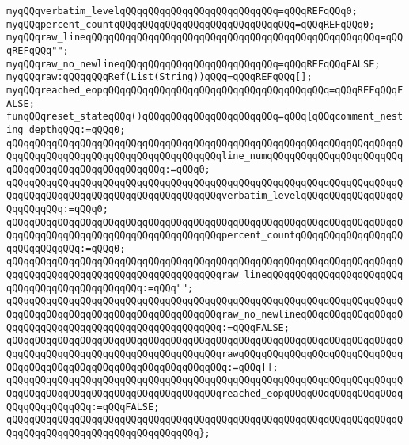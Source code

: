 \verb|myqQQqverbatim_levelqQQqqQQqqQQqqQQqqQQqqQQqqQQq=qQQqREFqQQq0;|\newline
\verb|myqQQqpercent_countqQQqqQQqqQQqqQQqqQQqqQQqqQQqqQQq=qQQqREFqQQq0;|\newline
\verb|myqQQqraw_lineqQQqqQQqqQQqqQQqqQQqqQQqqQQqqQQqqQQqqQQqqQQqqQQqqQQq=qQQqREFqQQq"";|\newline
\verb|myqQQqraw_no_newlineqQQqqQQqqQQqqQQqqQQqqQQqqQQq=qQQqREFqQQqFALSE;|\newline
\verb|myqQQqraw:qQQqqQQqRef(List(String))qQQq=qQQqREFqQQq[];|\newline
\verb|myqQQqreached_eopqQQqqQQqqQQqqQQqqQQqqQQqqQQqqQQqqQQqqQQq=qQQqREFqQQqFALSE;|\newline
\newline
\verb|funqQQqreset_stateqQQq()qQQqqQQqqQQqqQQqqQQqqQQq=qQQq{qQQqcomment_nesting_depthqQQq:=qQQq0;|\newline
\verb|qQQqqQQqqQQqqQQqqQQqqQQqqQQqqQQqqQQqqQQqqQQqqQQqqQQqqQQqqQQqqQQqqQQqqQQqqQQqqQQqqQQqqQQqqQQqqQQqqQQqqQQqqQQqline_numqQQqqQQqqQQqqQQqqQQqqQQqqQQqqQQqqQQqqQQqqQQqqQQqqQQq:=qQQq0;|\newline
\verb|qQQqqQQqqQQqqQQqqQQqqQQqqQQqqQQqqQQqqQQqqQQqqQQqqQQqqQQqqQQqqQQqqQQqqQQqqQQqqQQqqQQqqQQqqQQqqQQqqQQqqQQqqQQqverbatim_levelqQQqqQQqqQQqqQQqqQQqqQQqqQQq:=qQQq0;|\newline
\verb|qQQqqQQqqQQqqQQqqQQqqQQqqQQqqQQqqQQqqQQqqQQqqQQqqQQqqQQqqQQqqQQqqQQqqQQqqQQqqQQqqQQqqQQqqQQqqQQqqQQqqQQqqQQqpercent_countqQQqqQQqqQQqqQQqqQQqqQQqqQQqqQQq:=qQQq0;|\newline
\verb|qQQqqQQqqQQqqQQqqQQqqQQqqQQqqQQqqQQqqQQqqQQqqQQqqQQqqQQqqQQqqQQqqQQqqQQqqQQqqQQqqQQqqQQqqQQqqQQqqQQqqQQqqQQqraw_lineqQQqqQQqqQQqqQQqqQQqqQQqqQQqqQQqqQQqqQQqqQQqqQQq:=qQQq"";|\newline
\verb|qQQqqQQqqQQqqQQqqQQqqQQqqQQqqQQqqQQqqQQqqQQqqQQqqQQqqQQqqQQqqQQqqQQqqQQqqQQqqQQqqQQqqQQqqQQqqQQqqQQqqQQqqQQqraw_no_newlineqQQqqQQqqQQqqQQqqQQqqQQqqQQqqQQqqQQqqQQqqQQqqQQqqQQqqQQq:=qQQqFALSE;|\newline
\verb|qQQqqQQqqQQqqQQqqQQqqQQqqQQqqQQqqQQqqQQqqQQqqQQqqQQqqQQqqQQqqQQqqQQqqQQqqQQqqQQqqQQqqQQqqQQqqQQqqQQqqQQqqQQqrawqQQqqQQqqQQqqQQqqQQqqQQqqQQqqQQqqQQqqQQqqQQqqQQqqQQqqQQqqQQqqQQqqQQq:=qQQq[];|\newline
\verb|qQQqqQQqqQQqqQQqqQQqqQQqqQQqqQQqqQQqqQQqqQQqqQQqqQQqqQQqqQQqqQQqqQQqqQQqqQQqqQQqqQQqqQQqqQQqqQQqqQQqqQQqqQQqreached_eopqQQqqQQqqQQqqQQqqQQqqQQqqQQqqQQqqQQq:=qQQqFALSE;|\newline
\verb|qQQqqQQqqQQqqQQqqQQqqQQqqQQqqQQqqQQqqQQqqQQqqQQqqQQqqQQqqQQqqQQqqQQqqQQqqQQqqQQqqQQqqQQqqQQqqQQqqQQqqQQq};|\newline

